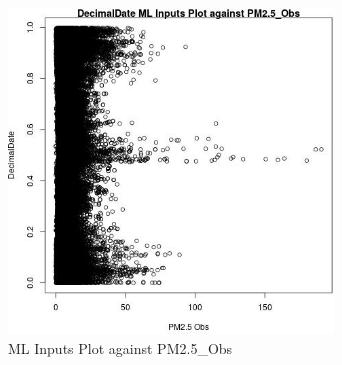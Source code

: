 \begin{figure} 
\centering  
\includegraphics[width=0.77\textwidth]{Code_Outputs/Report_ML_input_PM25_Step4_part_e_de_duplicated_aves_DecimalDatevPM25_Obs.jpg} 
\caption{\label{fig:Report_ML_input_PM25_Step4_part_e_de_duplicated_avesDecimalDatevPM25_Obs}ML Inputs Plot against PM2.5_Obs} 
\end{figure} 
 
